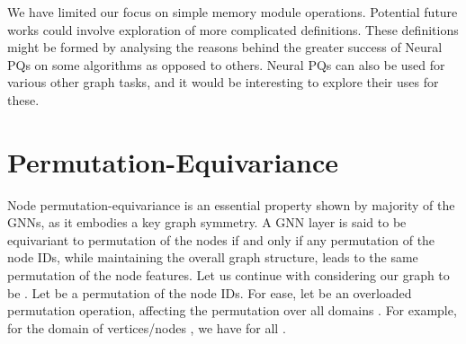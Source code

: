 \documentclass{article}
\newif\ifaccepted
\theoremstyle{plain}
\theoremstyle{definition}
\theoremstyle{remark}
\begin{document}
We have limited our focus on simple memory module operations. Potential future works could involve exploration of more complicated definitions.
These definitions might be formed by analysing the reasons behind the greater success of Neural PQs on some algorithms as opposed to others.
Neural PQs can also be used for various other graph tasks, and it would be interesting to explore their uses for these.

\ifaccepted
\section*{Acknowledgements}

We thank Adrià Puigdomènech and Karl Tuyls for reviewing the paper prior to the submission.

\fi






\newpage
\appendix
\onecolumn

\section{Permutation-Equivariance}
\label{sec:appendix-permutation-equivariance}
Node permutation-equivariance is an essential property shown by majority of the GNNs, as it embodies a key graph symmetry.
A GNN layer is said to be equivariant to permutation of the nodes if and only if any permutation of the node IDs, while maintaining
the overall graph structure, leads to the same permutation of the node features. Let us continue with considering our
graph to be . Let  be a permutation of the node IDs.
For ease, let  be an overloaded permutation operation, affecting the permutation  over all domains .
For example, for the domain of vertices/nodes , we have  for all .
\end{document}
